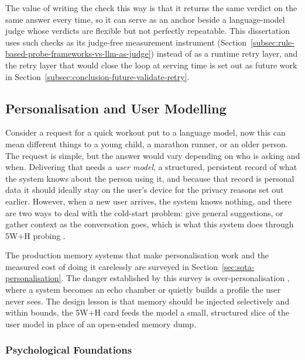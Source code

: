 The value of writing the check this way is that it returns the same verdict on the same answer every time, so it can serve as an anchor beside a language-model judge whose verdicts are flexible but not perfectly repeatable. This dissertation uses such checks as its judge-free measurement instrument (Section~\ref{subsec:rule-based-probe-frameworks-vs-llm-as-judge}) instead of as a runtime retry layer, and the retry layer that would close the loop at serving time is set out as future work in Section~\ref{subsec:conclusion-future-validate-retry}.

\subsection{Personalisation and User Modelling}
\label{sec:personalisation-and-user-modelling}

Consider a request for a quick workout put to a language model, now this can mean different things to a young child, a marathon runner, or an older person. The request is simple, but the answer would vary depending on who is asking and when. Delivering that needs a \emph{user model}, a structured, persistent record of what the system knows about the person using it, and because that record is personal data it should ideally stay on the user's device for the privacy reasons set out earlier. However, when a new user arrives, the system knows nothing, and there are two ways to deal with the cold-start problem: give general suggestions, or gather context as the conversation goes, which is what this system does through 5W+H probing \cite{akbar2024hitlpipa}.

The production memory systems that make personalisation work and the measured cost of doing it carelessly are surveyed in Section~\ref{sec:sota-personalisation}. The danger established by this survey is over-personalisation \cite{spadea2025avoidingoverpersonalizationruleguidedknowledge, hu2026opbenchbenchmarkingoverpersonalizationmemoryaugmented}, where a system becomes an echo chamber or quietly builds a profile the user never sees. The design lesson is that memory should be injected selectively and within bounds, the 5W+H card feeds the model a small, structured slice of the user model in place of an open-ended memory dump.

\subsubsection{Psychological Foundations}
\label{subsec:psychological-foundations}

